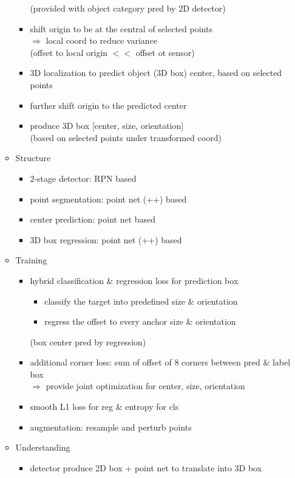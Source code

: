 \begin{itemize}
\begin{itemize}
\begin{itemize}
		(provided with object category pred by 2D detector)
		\item shift origin to be at the central of selected points \\
		$\Rightarrow$ local coord to reduce variance \\ 
		(offset to local origin $<<$ offset ot sensor)
		\item 3D localization to predict object (3D box) center, based on selected points
		\item further shift origin to the predicted center
		\item produce 3D box [center, size, orientation] \\
		(based on selected points under transformed coord)
		\end{itemize}
	\item Structure
		\begin{itemize}
		\item 2-stage detector: RPN based
		\item point segmentation: point net (++) based
		\item center prediction: point net based
		\item 3D box regression: point net (++) based
		\end{itemize}
	\item Training
		\begin{itemize}
		\item hybrid classification \& regression loss for prediction box \\
			\begin{itemize}
			\item classify the target into predefined size \& orientation
			\item regress the offset to every anchor size \& orientation
			\end{itemize}
		(box center pred by regression)
		\item additional corner loss: sum of offset of 8 corners between pred \& label box \\
		$\Rightarrow$ provide joint optimization for center, size, orientation
		\item smooth L1 loss for reg \& entropy for cls
		\item augmentation: resample and perturb points
		\end{itemize}
	\item Understanding
		\begin{itemize}
		\item detector produce 2D box + point net to translate into 3D box

\end{itemize}
\end{itemize}
\end{itemize}
